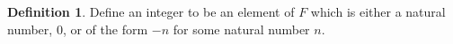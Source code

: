 \documentclass[12pt, letterpaper]{article}
\theoremstyle{definition} %
\newtheorem*{definition}{Definition}
\begin{document}
\section{}

\begin{definition}
    Define an integer to be an element of $F$ which is either a natural number,
    0, or of the form $-n$ for some natural number $n$.
\end{definition}

\subsection{}
\end{document}
